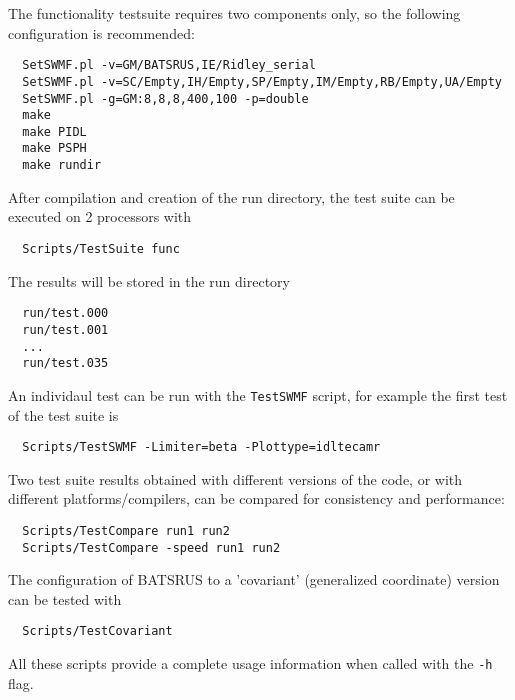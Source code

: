 The functionality testsuite requires two components only,
so the following configuration is recommended:
\begin{verbatim}
  SetSWMF.pl -v=GM/BATSRUS,IE/Ridley_serial
  SetSWMF.pl -v=SC/Empty,IH/Empty,SP/Empty,IM/Empty,RB/Empty,UA/Empty
  SetSWMF.pl -g=GM:8,8,8,400,100 -p=double
  make
  make PIDL
  make PSPH
  make rundir
\end{verbatim}
After compilation and creation of the run directory, the test suite
can be executed on 2 processors with
\begin{verbatim}
  Scripts/TestSuite func
\end{verbatim}
The results will be stored in the run directory
\begin{verbatim}
  run/test.000
  run/test.001
  ...
  run/test.035
\end{verbatim}
An individaul test can be run with the {\tt TestSWMF} script,
for example the first test of the test suite is 
\begin{verbatim}
  Scripts/TestSWMF -Limiter=beta -Plottype=idltecamr
\end{verbatim}
Two test suite results obtained with different versions of the code,
or with different platforms/compilers, can be compared for 
consistency and performance:
\begin{verbatim}
  Scripts/TestCompare run1 run2
  Scripts/TestCompare -speed run1 run2
\end{verbatim}
The configuration of BATSRUS to a 'covariant' (generalized coordinate) version
can be tested with
\begin{verbatim}
  Scripts/TestCovariant
\end{verbatim}
All these scripts provide a complete usage information when called with the 
{\tt -h} flag.
%
